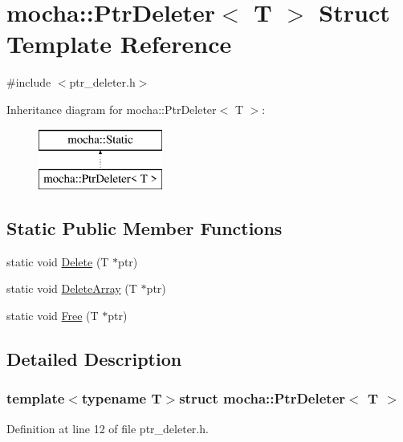\hypertarget{structmocha_1_1_ptr_deleter}{
\section{mocha::PtrDeleter$<$ T $>$ Struct Template Reference}
\label{structmocha_1_1_ptr_deleter}
}


{\ttfamily \#include $<$ptr\_\-deleter.h$>$}

Inheritance diagram for mocha::PtrDeleter$<$ T $>$:\begin{figure}[H]
\begin{center}
\leavevmode
\includegraphics[height=2.000000cm]{structmocha_1_1_ptr_deleter}
\end{center}
\end{figure}
\subsection*{Static Public Member Functions}
\begin{DoxyCompactItemize}
\item 
static void \hyperlink{structmocha_1_1_ptr_deleter_ae1ac912ef3338b12632da281a09f2370}{Delete} (T $\ast$ptr)
\item 
static void \hyperlink{structmocha_1_1_ptr_deleter_a86848e3c60cb1a11a9e55bd1210aa7dd}{DeleteArray} (T $\ast$ptr)
\item 
static void \hyperlink{structmocha_1_1_ptr_deleter_adf3042323308fc690b4ff8d4eefb6e28}{Free} (T $\ast$ptr)
\end{DoxyCompactItemize}


\subsection{Detailed Description}
\subsubsection*{template$<$typename T$>$struct mocha::PtrDeleter$<$ T $>$}



Definition at line 12 of file ptr\_\-deleter.h.




